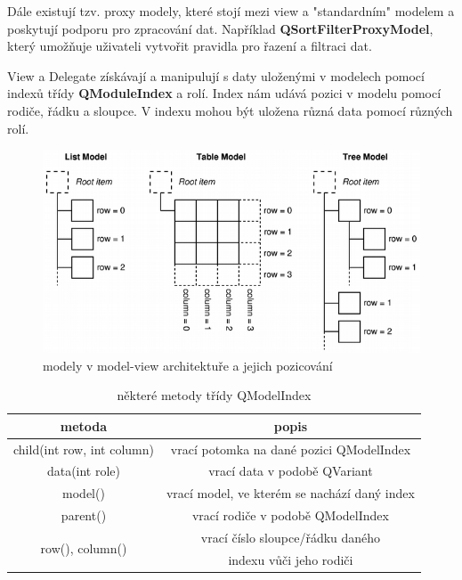 Dále existují tzv. proxy modely, které stojí mezi view a "standardním" modelem a poskytují podporu pro zpracování dat.  Například \textbf{QSortFilterProxyModel}, který umožňuje uživateli vytvořit pravidla pro řazení a filtraci dat.

View a Delegate získávají a manipulují s daty uloženými v modelech pomocí indexů třídy \textbf{QModuleIndex} a rolí. Index nám udává pozici v modelu pomocí rodiče, řádku a sloupce. V indexu mohou být uložena různá data pomocí různých rolí.

\begin{figure}[h]
	\centering
	\includegraphics[scale=0.7]{pictures/qt/mv_models}
	\caption{modely v model-view architektuře a jejich pozicování}
	\label{mvModels}
\end{figure} 

\begin{table}[h]
	\centering
	\begin{tabular}{|c|c|}
		\hline	
		metoda & popis \\
		\hline
		\hline
		child(int row, int column) & vrací potomka na dané pozici QModelIndex \\
		\hline
		data(int role) & vrací data v podobě QVariant \\
		\hline
		model() & vrací model, ve kterém se nachází daný index \\
		\hline
		parent() & vrací rodiče v podobě QModelIndex \\
		\hline
	 	\multirow{2}{*}{row(), column()} & vrací číslo sloupce/řádku daného \\ 
		 & indexu vůči jeho rodiči \\
		\hline
	\end{tabular}
	\caption{některé metody třídy QModelIndex}
	\label{tab:qmodelindex}
\end{table}

